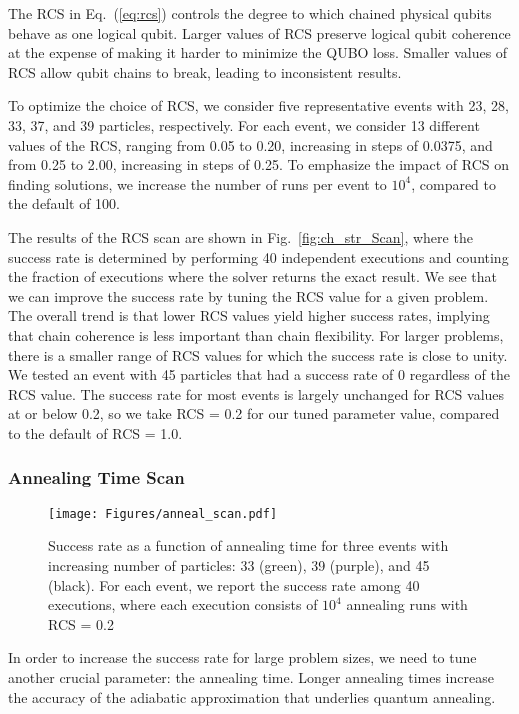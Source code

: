 \documentclass[aps,prd,twocolumn,superscriptaddress,preprintnumbers,nofootinbib,longbibliography,floatfix]{revtex4-1}
\DeclareRobustCommand{\Fig}[1]{Fig.~\ref{fig:#1}}
\DeclareRobustCommand{\Eq}[1]{Eq.~(\ref{eq:#1})}
\begin{document}
The RCS in \Eq{rcs} controls the degree to which chained physical qubits behave as one logical qubit.
%
Larger values of RCS preserve logical qubit coherence at the expense of making it harder to minimize the QUBO loss.
%
Smaller values of RCS allow qubit chains to break, leading to inconsistent results.


To optimize the choice of RCS, we consider five representative events with 23, 28, 33, 37, and 39 particles, respectively.
%
For each event, we consider 13 different values of the RCS, ranging from 0.05 to 0.20, increasing in steps of 0.0375, and from 0.25 to 2.00, increasing in steps of 0.25.
%
To emphasize the impact of RCS on finding solutions, we increase the number of runs per event to $10^4$, compared to the default of 100.


The results of the RCS scan are shown in \Fig{ch_str_Scan}, where the success rate is determined by performing 40 independent executions and counting the fraction of executions where the solver returns the exact result.
%
We see that we can improve the success rate by tuning the RCS value for a given problem.
%
The overall trend is that lower RCS values yield higher success rates, implying that chain coherence is less important than chain flexibility.
%
For larger problems, there is a smaller range of RCS values for which the success rate is close to unity.
%
We tested an event with 45 particles that had a success rate of 0 regardless of the RCS value.
%
The success rate for most events is largely unchanged for RCS values at or below 0.2, so we take RCS = 0.2 for our tuned parameter value, compared to the default of RCS = 1.0.



\subsubsection{Annealing Time Scan}

\begin{figure}[t]
\centering
\texttt{[image: Figures/anneal\_scan.pdf]}\\
\caption{
%
Success rate as a function of annealing time for three events with increasing number of particles: 33 (green), 39 (purple), and 45 (black).
%
For each event, we report the success rate among 40 executions, where each execution consists of $10^{4}$ annealing runs with RCS = 0.2
}
\label{fig:anneal_scan}
\end{figure}


In order to increase the success rate for large problem sizes, we need to tune another crucial parameter: the annealing time.
%
Longer annealing times increase the accuracy of the adiabatic approximation that underlies quantum annealing.
\end{document}
